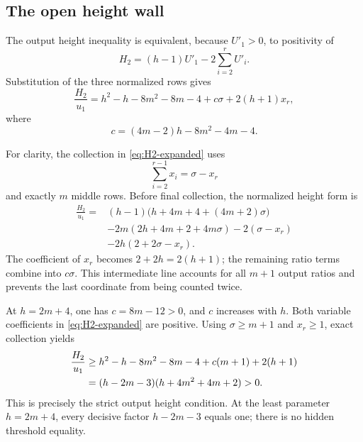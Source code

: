 \documentclass[11pt]{article}
\theoremstyle{remark}
\numberwithin{equation}{section}
\begin{document}
\subsection{The open height wall}

The output height inequality is equivalent, because \(U'_1>0\), to
positivity of
\begin{equation}\label{eq:H2-def}
H_2=(h-1)U'_1-2\sum_{i=2}^{r}U'_i.
\end{equation}
Substitution of the three normalized rows gives
\begin{equation}\label{eq:H2-expanded}
\frac{H_2}{u_1}
=h^2-h-8m^2-8m-4+c\sigma+2(h+1)x_r,
\end{equation}
where
\begin{equation}\label{eq:c-height}
c=(4m-2)h-8m^2-4m-4.
\end{equation}

For clarity, the collection in \eqref{eq:H2-expanded} uses
\[
\sum_{i=2}^{r-1}x_i=\sigma-x_r
\]
and exactly \(m\) middle rows.  Before final collection, the normalized
height form is
\begin{align*}
\frac{H_2}{u_1}
={}&(h-1)\bigl(h+4m+4+(4m+2)\sigma\bigr)\\
&-2m(2h+4m+2+4m\sigma)
-2(\sigma-x_r)\\
&-2h(2+2\sigma-x_r).
\end{align*}
The coefficient of \(x_r\) becomes \(2+2h=2(h+1)\); the remaining
ratio terms combine into \(c\sigma\).  This intermediate line accounts for
all \(m+1\) output ratios and prevents the last coordinate from being
counted twice.

At \(h=2m+4\), one has \(c=8m-12>0\), and \(c\) increases with \(h\).
Both variable coefficients in \eqref{eq:H2-expanded} are positive.  Using
\(\sigma\geq m+1\) and \(x_r\geq1\), exact collection yields
\begin{align}
\frac{H_2}{u_1}
&\geq h^2-h-8m^2-8m-4+c(m+1)+2(h+1) \notag\\
&=(h-2m-3)(h+4m^2+4m+2)>0.
\label{eq:height-bound}
\end{align}
This is precisely the strict output height condition.  At the least
parameter \(h=2m+4\), every decisive factor \(h-2m-3\) equals one; there
is no hidden threshold equality.
\end{document}
